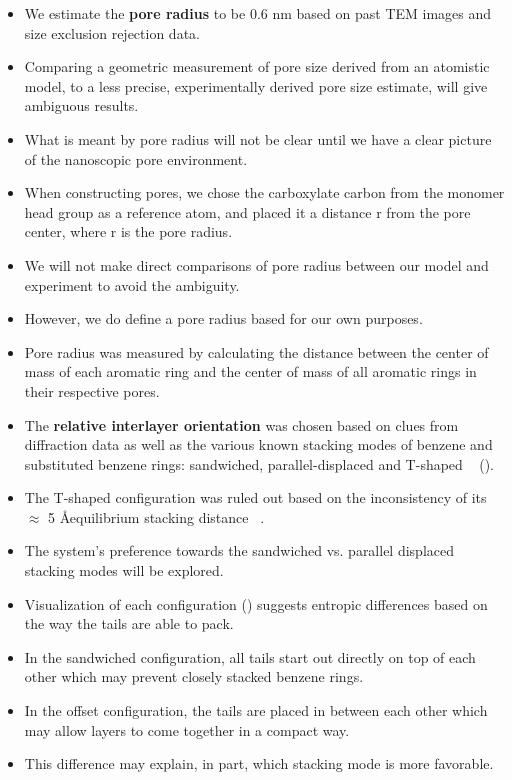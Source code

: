 \documentclass{article}
\newcommand{\angstrom}{\textup{\AA}}
\begin{document}
\begin{itemize}
    $\approx$ 4.1 \angstrom, which inspired separate systems starting with layer 
    spacings greater than 4 \angstrom.
    \item We estimate the \textbf{pore radius} to be 0.6 nm based on past TEM images 
    and size exclusion rejection data\cite{feng_scalable_2014,feng_thin_2016,
    zhou_supported_2005}.
    \item Comparing a geometric measurement of pore size derived from an 
    atomistic model, to a less precise, experimentally derived pore size estimate,
    will give ambiguous results.
    \item What is meant by pore radius will not be clear until we have a clear picture
    of the nanoscopic pore environment.
    \item When constructing pores, we chose the carboxylate carbon from the monomer
    head group as a reference atom, and placed it a distance r from the pore center,
    where r is the pore radius.  %
    \item We will not make direct comparisons of pore radius between our model 
    and experiment to avoid the ambiguity. 
    \item However, we do define a pore radius based for our own purposes.
    \item Pore radius was measured by calculating the distance between the center of 
    mass of each aromatic ring and the center of mass of all aromatic rings in their 
    respective pores.
    \item The \textbf{relative interlayer orientation} was chosen based on clues from 
    diffraction data as well as the various known stacking modes of benzene 
    and substituted benzene rings: sandwiched, parallel-displaced and T-shaped
    ~\cite{sinnokrot_estimates_2002} ().
    \item The T-shaped configuration was ruled out based on the inconsistency of
    its $\approx$ 5 \angstrom equilibrium stacking distance ~\cite{sinnokrot_estimates_2002}.
    \item The system's preference towards the sandwiched vs. parallel displaced 
    stacking modes will be explored.
    \item Visualization of each configuration ()
    suggests entropic differences based on the way the tails are able to pack.
    \item In the sandwiched configuration, all tails start out directly on top
    of each other which may prevent closely stacked benzene rings.
    \item In the offset configuration, the tails are placed in between each other 
    which may allow layers to come together in a compact way.
    \item This difference may explain, in part, which stacking mode is more favorable.
  \end{itemize}
\end{document}
